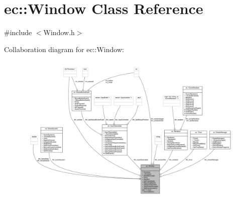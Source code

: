 \hypertarget{classec_1_1_window}{}\section{ec\+:\+:Window Class Reference}
\label{classec_1_1_window}


{\ttfamily \#include $<$Window.\+h$>$}



Collaboration diagram for ec\+:\+:Window\+:
\nopagebreak
\begin{figure}[H]
\begin{center}
\leavevmode
\includegraphics[width=350pt]{classec_1_1_window__coll__graph}
\end{center}
\end{figure}
